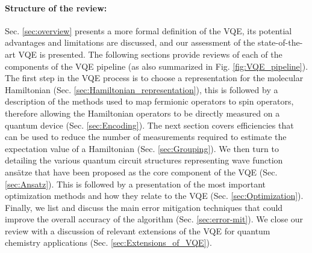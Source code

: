 \paragraph{Structure of the review:} Sec. \ref{sec:overview} presents a more formal definition of the VQE, its potential advantages and limitations are discussed, and our assessment of the state-of-the-art VQE is presented. The following sections provide reviews of each of the components of the VQE pipeline (as also summarized in Fig. \ref{fig:VQE_pipeline}). The first step in the VQE process is to choose a representation for the molecular Hamiltonian (Sec. \ref{sec:Hamiltonian_representation}), this is followed by a description of the methods used to map fermionic operators to spin operators, therefore allowing the Hamiltonian operators to be directly measured on a quantum device (Sec. \ref{sec:Encoding}). The next section covers efficiencies that can be used to reduce the number of measurements required to estimate the expectation value of a Hamiltonian (Sec. \ref{sec:Grouping}). We then turn to detailing the various quantum circuit structures representing wave function ans\"atze that have been proposed as the core component of the VQE (Sec. \ref{sec:Ansatz}). This is followed by a presentation of the most important optimization methods and how they relate to the VQE (Sec. \ref{sec:Optimization}). Finally, we list and discuss the main error mitigation techniques that could improve the overall accuracy of the algorithm (Sec. \ref{sec:error-mit}). We close our review with a discussion of relevant extensions of the VQE for quantum chemistry applications (Sec. \ref{sec:Extensions_of_VQE}).

